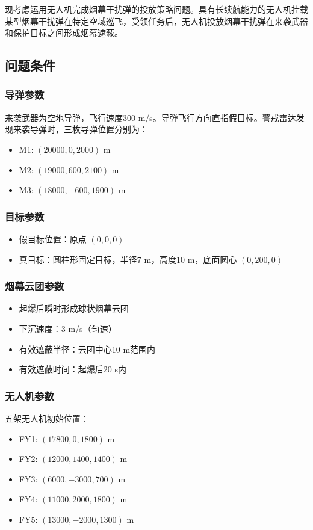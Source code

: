 \documentclass[12pt,a4paper]{article}
\begin{document}
现考虑运用无人机完成烟幕干扰弹的投放策略问题。具有长续航能力的无人机挂载某型烟幕干扰弹在特定空域巡飞，受领任务后，无人机投放烟幕干扰弹在来袭武器和保护目标之间形成烟幕遮蔽。

\subsection{问题条件}

\subsubsection{导弹参数}
来袭武器为空地导弹，飞行速度300 m/s。导弹飞行方向直指假目标。警戒雷达发现来袭导弹时，三枚导弹位置分别为：
\begin{itemize}
    \item M1: $(20000, 0, 2000)$ m
    \item M2: $(19000, 600, 2100)$ m
    \item M3: $(18000, -600, 1900)$ m
\end{itemize}

\subsubsection{目标参数}
\begin{itemize}
    \item 假目标位置：原点 $(0, 0, 0)$
    \item 真目标：圆柱形固定目标，半径7 m，高度10 m，底面圆心 $(0, 200, 0)$
\end{itemize}

\subsubsection{烟幕云团参数}
\begin{itemize}
    \item 起爆后瞬时形成球状烟幕云团
    \item 下沉速度：3 m/s（匀速）
    \item 有效遮蔽半径：云团中心10 m范围内
    \item 有效遮蔽时间：起爆后20 s内
\end{itemize}

\subsubsection{无人机参数}
五架无人机初始位置：
\begin{itemize}
    \item FY1: $(17800, 0, 1800)$ m
    \item FY2: $(12000, 1400, 1400)$ m
    \item FY3: $(6000, -3000, 700)$ m
    \item FY4: $(11000, 2000, 1800)$ m
    \item FY5: $(13000, -2000, 1300)$ m
\end{itemize}
\end{document}
